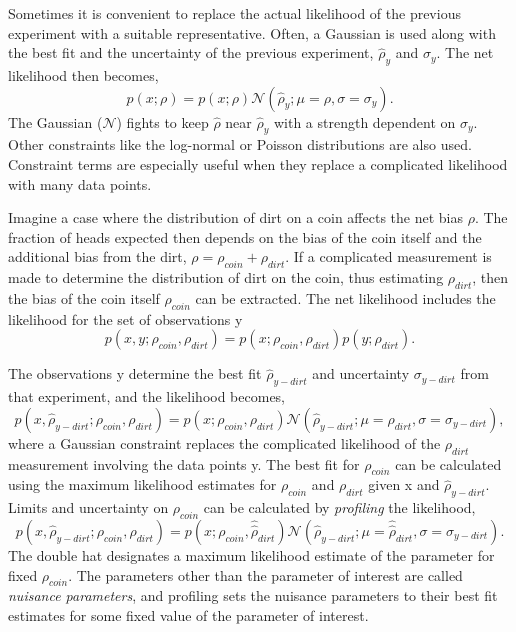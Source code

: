 Sometimes it is convenient to replace the actual likelihood of the previous experiment with a suitable representative. Often, a Gaussian is used along with the best fit and the uncertainty of the previous experiment, $\hat{\rho}_{y}$ and $\sigma_y$. The net likelihood then becomes,
\begin{equation}
p(x; \rho) = p(x; \rho) \mathcal{N}(\hat{\rho}_y; \mu=\rho, \sigma=\sigma_y).
\end{equation}
The Gaussian ($\mathcal{N}$) fights to keep $\hat{\rho}$ near $\hat{\rho}_y$ with a strength dependent on $\sigma_y$. Other constraints like the log-normal or Poisson distributions are also used. Constraint terms are especially useful when they replace a complicated likelihood with many data points. 

Imagine a case where the distribution of dirt on a coin affects the net bias $\rho$. The fraction of heads expected then depends on the bias of the coin itself and the additional bias from the dirt, $\rho = \rho_{coin} + \rho_{dirt}$. If a complicated measurement is made to determine the distribution of dirt on the coin, thus estimating $\rho_{dirt}$, then the bias of the coin itself $\rho_{coin}$ can be extracted. The net likelihood includes the likelihood for the set of observations y
\begin{equation}
p(x, y; \rho_{coin}, \rho_{dirt}) = p(x; \rho_{coin}, \rho_{dirt})p(y; \rho_{dirt}).
\end{equation}

The observations y determine the best fit $\hat{\rho}_{y-dirt}$ and uncertainty $\sigma_{y-dirt}$ from that experiment, and the likelihood becomes, 
\begin{equation}
p(x, \hat{\rho}_{y-dirt}; \rho_{coin}, \rho_{dirt}) = p(x; \rho_{coin}, \rho_{dirt})
                                   \mathcal{N}(\hat{\rho}_{y-dirt}; \mu=\rho_{dirt}, \sigma=\sigma_{y-dirt}),
\end{equation}
where a Gaussian constraint replaces the complicated likelihood of the $\rho_{dirt}$ measurement involving the data points y. The best fit for $\rho_{coin}$ can be calculated using the maximum likelihood estimates for $\rho_{coin}$ and $\rho_{dirt}$ given x and $\hat{\rho}_{y-dirt}$. Limits and uncertainty on $\rho_{coin}$ can be calculated by \textit{profiling} the likelihood,  
\begin{equation}
p(x, \hat{\rho}_{y-dirt}; \rho_{coin}, \hat{\hat{\rho}}_{dirt}) = p(x; \rho_{coin}, \hat{\hat{\rho}}_{dirt})
                                   \mathcal{N}(\hat{\rho}_{y-dirt}; \mu=\hat{\hat{\rho}}_{dirt}, \sigma=\sigma_{y-dirt}).
\end{equation}
The double hat designates a maximum likelihood estimate of the parameter for fixed $\rho_{coin}$. The parameters other than the parameter of interest are called \textit{nuisance parameters}, and profiling sets the nuisance parameters to their best fit estimates for some fixed value of the parameter of interest. 

